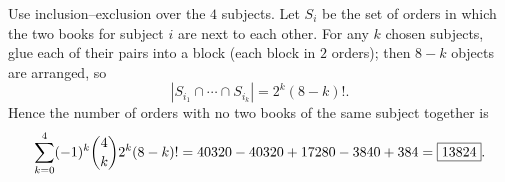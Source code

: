 Use inclusion--exclusion over the $4$ subjects. Let $S_i$ be the set of orders in which the two books for subject $i$ are next to each other. For any $k$ chosen subjects, glue each of their pairs into a block (each block in $2$ orders); then $8-k$ objects are arranged, so
\[|S_{i_1}\cap\cdots\cap S_{i_k}|=2^k(8-k)!.\]
Hence the number of orders with no two books of the same subject together is
\[\sum_{k=0}^{4}(-1)^k\dbinom4k2^k(8-k)!=40320-40320+17280-3840+384=\boxed{13824}.\]
